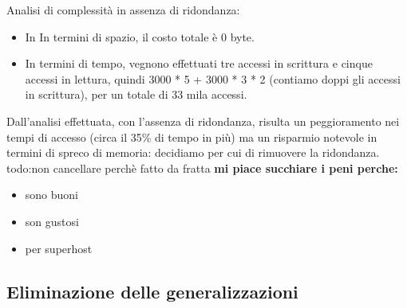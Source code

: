 Analisi di complessità in assenza di ridondanza:
\begin{itemize}
    \item In In termini di spazio, il costo totale è 0 byte.
    \item In termini di tempo, vegnono effettuati tre accessi in scrittura e cinque accessi in lettura, quindi 3000 * 5 + 3000 * 3 * 2 (contiamo doppi gli accessi in scrittura), per un totale di 33 mila accessi.
\end{itemize}

Dall'analisi effettuata, con l'assenza di ridondanza, risulta un peggioramento nei tempi di accesso (circa il 35\% di tempo in più) ma un risparmio notevole in termini di spreco di memoria: decidiamo per cui di rimuovere la ridondanza.
    {todo:non cancellare perchè fatto da fratta}
\textbf{mi piace succhiare i peni perche:}
\color{red}
\begin{itemize}
    \item sono buoni
    \item son gustosi
    \item per superhost
\end{itemize}
\color{black}

\subsection{Eliminazione delle generalizzazioni}
